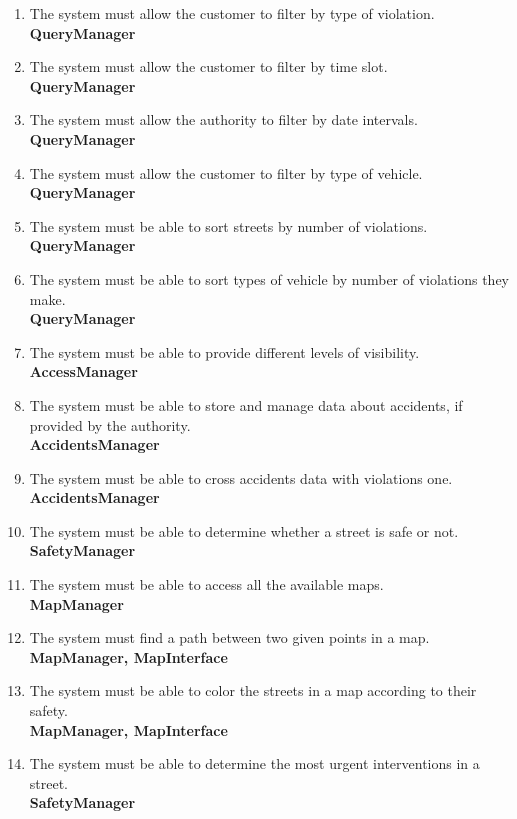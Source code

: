 \begin{enumerate}[label=\textbf{R\arabic*}]
		\item \label{req:violationFilter} The system must allow the customer to filter by type of violation.\\
		\textbf{QueryManager}
		\item \label{req:timeFilter} The system must allow the customer to filter by time slot.\\
		\textbf{QueryManager}
		\item \label{req:dateFilter} The system must allow the authority to filter by date intervals.\\
		\textbf{QueryManager}
		\item \label{req:vehicleFilter} The system must allow the customer to filter by type of vehicle.\\
		\textbf{QueryManager}
		\item \label{req:sortedResult} The system must be able to sort streets by number of violations.\\
		\textbf{QueryManager}
		\item \label{req:sortedVehicles} The system must be able to sort types of vehicle by number of violations they make.\\
		\textbf{QueryManager}
		\item \label{req:visibility} The system must be able to provide different levels of visibility.\\
		\textbf{AccessManager}
		\item \label{req:accidentsData} The system must be able to store and manage data about accidents, if provided by the authority.\\
		\textbf{AccidentsManager}
		\item \label{req:crossData} The system must be able to cross accidents data with violations one.\\
		\textbf{AccidentsManager}
		\item \label{req:safeStreet} The system must be able to determine whether a street is safe or not.\\
		\textbf{SafetyManager}
		\item \label{req:cityStreets} The system must be able to access all the available maps.\\
		\textbf{MapManager}
		\item \label{req:pathFinder} The system must find a path between two given points in a map.\\
		\textbf{MapManager, MapInterface}
		\item \label{req:colorMap} The system must be able to color the streets in a map according to their safety.\\
		\textbf{MapManager, MapInterface}
		\item \label{req:interventions} The system must be able to determine the most urgent interventions in a street.	\\
		\textbf{SafetyManager}
	\end{enumerate}
